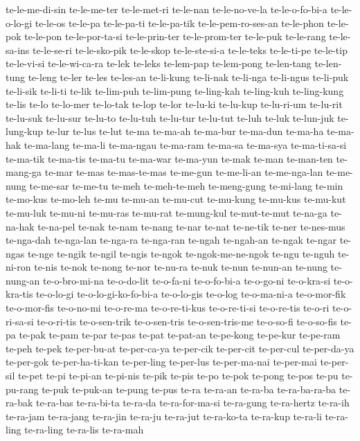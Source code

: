 {te-le-me-di-sin te-le-me-ter te-le-met-ri te-le-nan te-le-no-ve-la
te-le-o-fo-bi-a te-le-o-lo-gi te-le-os te-le-pa te-le-pa-ti te-le-pa-tik
te-le-pem-ro-ses-an te-le-phon te-le-pok te-le-pon te-le-por-ta-si
te-le-prin-ter te-le-prom-ter te-le-puk te-le-rang te-le-sa-ins
te-le-se-ri te-le-sko-pik te-le-skop te-le-ste-si-a te-le-teks te-le-ti-pe
te-le-tip te-le-vi-si te-le-wi-ca-ra te-lek te-leks te-lem-pap te-lem-pong
te-len-tang te-len-tung te-leng te-ler te-les te-les-an te-li-kung
te-li-nak te-li-nga te-li-ngus te-li-puk te-li-sik te-li-ti te-lik
te-lim-puh te-lim-pung te-ling-kah te-ling-kuh te-ling-kung te-lis te-lo
te-lo-mer te-lo-tak te-lop te-lor te-lu-ki te-lu-kup te-lu-ri-um te-lu-rit
te-lu-suk te-lu-sur te-lu-to te-lu-tuh te-lu-tur te-lu-tut te-luh te-luk
te-lun-juk te-lung-kup te-lur te-lus te-lut te-ma te-ma-ah te-ma-bur
te-ma-dun te-ma-ha te-ma-hak te-ma-lang te-ma-li te-ma-ngau te-ma-ram
te-ma-sa te-ma-sya te-ma-ti-sa-si te-ma-tik te-ma-tis te-ma-tu te-ma-war
te-ma-yun te-mak te-man te-man-ten te-mang-ga te-mar te-mas te-mas-te-mas
te-me-gun te-me-li-an te-me-nga-lan te-me-nung te-me-sar te-me-tu te-meh
te-meh-te-meh te-meng-gung te-mi-lang te-min te-mo-kus te-mo-leh te-mu
te-mu-an te-mu-cut te-mu-kung te-mu-kus te-mu-kut te-mu-luk te-mu-ni
te-mu-ras te-mu-rat te-mung-kul te-mut-te-mut te-na-ga te-na-hak te-na-pel
te-nak te-nam te-nang te-nar te-nat te-ne-tik te-ner te-nes-mus te-nga-dah
te-nga-lan te-nga-ra te-nga-ran te-ngah te-ngah-an te-ngak te-ngar te-ngas
te-nge te-ngik te-ngil te-ngis te-ngok te-ngok-me-ne-ngok te-ngu te-nguh
te-ni-ron te-nis te-nok te-nong te-nor te-nu-ra te-nuk te-nun te-nun-an
te-nung te-nung-an te-o-bro-mi-na te-o-do-lit te-o-fa-ni te-o-fo-bi-a
te-o-go-ni te-o-kra-si te-o-kra-tis te-o-lo-gi te-o-lo-gi-ko-fo-bi-a
te-o-lo-gis te-o-log te-o-ma-ni-a te-o-mor-fik te-o-mor-fis te-o-no-mi
te-o-re-ma te-o-re-ti-kus te-o-re-ti-si te-o-re-tis te-o-ri te-o-ri-sa-si
te-o-ri-tis te-o-sen-trik te-o-sen-tris te-o-sen-tris-me te-o-so-fi
te-o-so-fis te-pa te-pak te-pam te-par te-pas te-pat te-pat-an te-pe-kong
te-pe-kur te-pe-ram te-peh te-pek te-per-bu-at te-per-ca-ya te-per-cik
te-per-cit te-per-cul te-per-da-ya te-per-gok te-per-ha-ti-kan te-per-ling
te-per-lus te-per-ma-nai te-per-mai te-per-sil te-pet te-pi te-pi-an
te-pi-nis te-pik te-pis te-po te-pok te-pong te-pos te-pu te-pu-rang
te-puk te-puk-an te-pung te-pus te-ra te-ra-an te-ra-ba te-ra-ba-ra-ba
te-ra-bak te-ra-bas te-ra-bi-ta te-ra-da te-ra-for-ma-si te-ra-gung
te-ra-hertz te-ra-ih te-ra-jam te-ra-jang te-ra-jin te-ra-ju te-ra-jut
te-ra-ko-ta te-ra-kup te-ra-li te-ra-ling te-ra-ling te-ra-lis te-ra-mah
}
